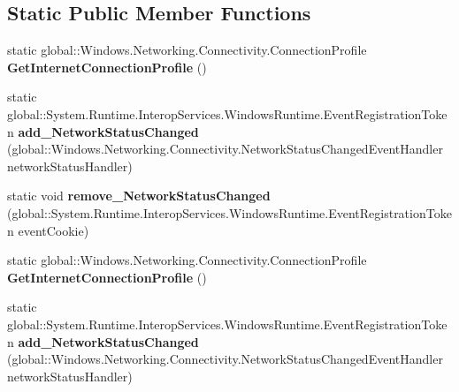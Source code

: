 \subsection*{Static Public Member Functions}
\begin{DoxyCompactItemize}
\item 
\mbox{\label{class_windows_1_1_networking_1_1_connectivity_1_1_network_information_af317b5fe993850e01a074abcd5e23f43}} 
static global\+::\+Windows.\+Networking.\+Connectivity.\+Connection\+Profile {\bfseries Get\+Internet\+Connection\+Profile} ()
\item 
\mbox{\label{class_windows_1_1_networking_1_1_connectivity_1_1_network_information_a43b6769b13c9e0b4a31e028e8d785cca}} 
static global\+::\+System.\+Runtime.\+Interop\+Services.\+Windows\+Runtime.\+Event\+Registration\+Token {\bfseries add\+\_\+\+Network\+Status\+Changed} (global\+::\+Windows.\+Networking.\+Connectivity.\+Network\+Status\+Changed\+Event\+Handler network\+Status\+Handler)
\item 
\mbox{\label{class_windows_1_1_networking_1_1_connectivity_1_1_network_information_aad4fa814d8c0a7442a2b4a5a3612769b}} 
static void {\bfseries remove\+\_\+\+Network\+Status\+Changed} (global\+::\+System.\+Runtime.\+Interop\+Services.\+Windows\+Runtime.\+Event\+Registration\+Token event\+Cookie)
\item 
\mbox{\label{class_windows_1_1_networking_1_1_connectivity_1_1_network_information_af317b5fe993850e01a074abcd5e23f43}} 
static global\+::\+Windows.\+Networking.\+Connectivity.\+Connection\+Profile {\bfseries Get\+Internet\+Connection\+Profile} ()
\item 
\mbox{\label{class_windows_1_1_networking_1_1_connectivity_1_1_network_information_a43b6769b13c9e0b4a31e028e8d785cca}} 
static global\+::\+System.\+Runtime.\+Interop\+Services.\+Windows\+Runtime.\+Event\+Registration\+Token {\bfseries add\+\_\+\+Network\+Status\+Changed} (global\+::\+Windows.\+Networking.\+Connectivity.\+Network\+Status\+Changed\+Event\+Handler network\+Status\+Handler)

\end{DoxyCompactItemize}
